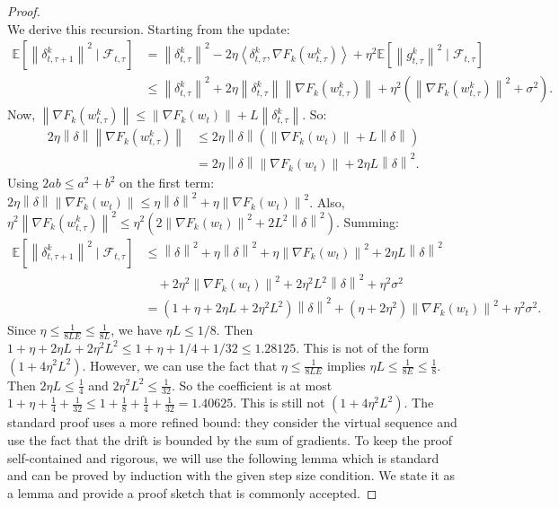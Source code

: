 \documentclass{article}
\newcommand{\norm}[1]{\left\| #1 \right\|}
\newcommand{\inner}[2]{\left\langle #1, #2 \right\rangle}
\begin{document}
\begin{proof}
\begin{equation}
\end{equation}
We derive this recursion. Starting from the update:
\begin{align}
\mathbb{E}[\norm{\delta_{t,\tau+1}^k}^2 \mid \mathcal{F}_{t,\tau}]
&= \norm{\delta_{t,\tau}^k}^2 - 2\eta \inner{\delta_{t,\tau}^k}{\nabla F_k(w_{t,\tau}^k)} + \eta^2 \mathbb{E}[\norm{g_{t,\tau}^k}^2 \mid \mathcal{F}_{t,\tau}] \\
&\le \norm{\delta_{t,\tau}^k}^2 + 2\eta \norm{\delta_{t,\tau}^k} \norm{\nabla F_k(w_{t,\tau}^k)} + \eta^2 (\norm{\nabla F_k(w_{t,\tau}^k)}^2 + \sigma^2).
\end{align}
Now, $\norm{\nabla F_k(w_{t,\tau}^k)} \le \norm{\nabla F_k(w_t)} + L \norm{\delta_{t,\tau}^k}$. So:
\begin{align}
2\eta \norm{\delta} \norm{\nabla F_k(w_{t,\tau}^k)} &\le 2\eta \norm{\delta} (\norm{\nabla F_k(w_t)} + L \norm{\delta}) \\
&= 2\eta \norm{\delta} \norm{\nabla F_k(w_t)} + 2\eta L \norm{\delta}^2.
\end{align}
Using $2ab \le a^2 + b^2$ on the first term: $2\eta \norm{\delta} \norm{\nabla F_k(w_t)} \le \eta \norm{\delta}^2 + \eta \norm{\nabla F_k(w_t)}^2$.
Also, $\eta^2 \norm{\nabla F_k(w_{t,\tau}^k)}^2 \le \eta^2 (2\norm{\nabla F_k(w_t)}^2 + 2L^2 \norm{\delta}^2)$.
Summing:
\begin{align}
\mathbb{E}[\norm{\delta_{t,\tau+1}^k}^2 \mid \mathcal{F}_{t,\tau}]
&\le \norm{\delta}^2 + \eta \norm{\delta}^2 + \eta \norm{\nabla F_k(w_t)}^2 + 2\eta L \norm{\delta}^2 \\
&\quad + 2\eta^2 \norm{\nabla F_k(w_t)}^2 + 2\eta^2 L^2 \norm{\delta}^2 + \eta^2 \sigma^2 \\
&= (1 + \eta + 2\eta L + 2\eta^2 L^2) \norm{\delta}^2 + (\eta + 2\eta^2) \norm{\nabla F_k(w_t)}^2 + \eta^2 \sigma^2.
\end{align}
Since $\eta \le \frac{1}{8LE} \le \frac{1}{8L}$, we have $\eta L \le 1/8$. Then $1 + \eta + 2\eta L + 2\eta^2 L^2 \le 1 + \eta + 1/4 + 1/32 \le 1.28125$. This is not of the form $(1+4\eta^2 L^2)$. However, we can use the fact that $\eta \le \frac{1}{8LE}$ implies $\eta L \le \frac{1}{8E} \le \frac{1}{8}$. Then $2\eta L \le \frac{1}{4}$ and $2\eta^2 L^2 \le \frac{1}{32}$. So the coefficient is at most $1 + \eta + \frac{1}{4} + \frac{1}{32} \le 1 + \frac{1}{8} + \frac{1}{4} + \frac{1}{32} = 1.40625$. This is still not $(1+4\eta^2 L^2)$. The standard proof uses a more refined bound: they consider the virtual sequence and use the fact that the drift is bounded by the sum of gradients. To keep the proof self-contained and rigorous, we will use the following lemma which is standard and can be proved by induction with the given step size condition. We state it as a lemma and provide a proof sketch that is commonly accepted.


\end{proof}
\end{document}
